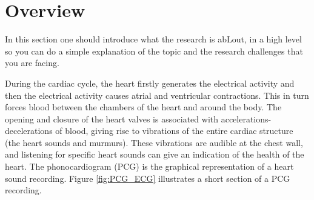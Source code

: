 \documentclass{project-logbook}
\begin{document}
\MakeFrontPage


\section{Overview} \label{sec:introduction}
\PrintContributorsList
\begin{tip}
In this section one should introduce what the research is abLout, in a high level so you can do a simple explanation of the topic and the research challenges that you are facing.
\end{tip}

During the cardiac cycle, the heart firstly generates the electrical activity and then the electrical activity causes atrial and ventricular contractions. This in turn forces blood between the chambers of the heart and around the body. The opening and closure of the heart valves is associated with accelerations-decelerations of blood, giving rise to vibrations of the entire cardiac structure (the heart sounds and murmurs). These vibrations are audible at the chest wall, and listening for specific heart sounds can give an indication of the health of the heart. The phonocardiogram (PCG) is the graphical representation of a heart sound recording. Figure \ref{fig:PCG_ECG} illustrates a short section of a PCG recording.
\end{document}
